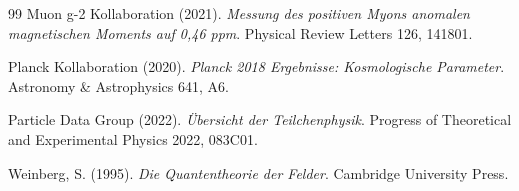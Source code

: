 \begin{thebibliography}{99}
		Muon g-2 Kollaboration (2021). \textit{Messung des positiven Myons anomalen magnetischen Moments auf 0,46 ppm}. Physical Review Letters 126, 141801.
		
		Planck Kollaboration (2020). \textit{Planck 2018 Ergebnisse: Kosmologische Parameter}. Astronomy \& Astrophysics 641, A6.
		
		Particle Data Group (2022). \textit{Übersicht der Teilchenphysik}. Progress of Theoretical and Experimental Physics 2022, 083C01.
		
		Weinberg, S. (1995). \textit{Die Quantentheorie der Felder}. Cambridge University Press.
	\end{thebibliography}
	